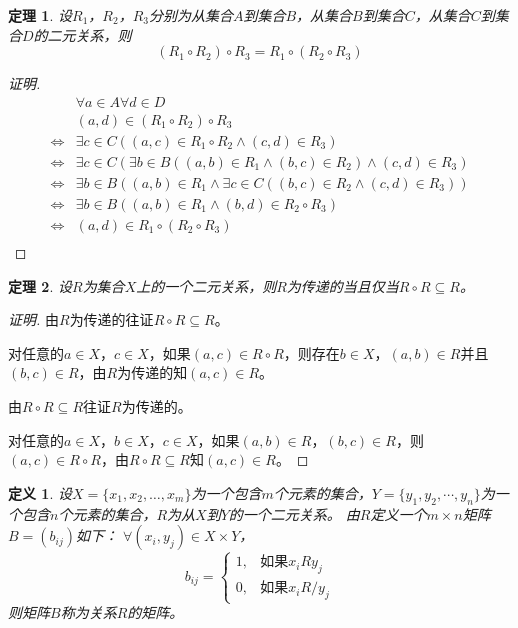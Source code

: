 \documentclass{book}[oneside]
\newtheorem{Def}{定义}[chapter]
\newtheorem{Thm}{定理}[chapter]
\begin{document}
\begin{CJK*}{UTF8}{gbsn}
    \begin{Thm}
    设$R_1$，$R_2$，$R_3$分别为从集合$A$到集合$B$，从集合$B$到集合$C$，从集合$C$到集合$D$的二元关系，则
    \[(R_1 \circ R_2)\circ R_3 = R_1 \circ (R_2 \circ R_3)\]
  \end{Thm}
  \begin{proof}[证明]
  \begin{align*}
    &\forall a\in A\forall d\in D\\
    &(a,d)\in (R_1\circ R_2)\circ R_3\\
    \Leftrightarrow&\exists c\in C((a,c)\in R_1\circ R_2 \land (c,d)\in R_3)\\
   \Leftrightarrow&\exists c\in C(\exists b\in B ((a,b)\in R_1 \land (b,c)\in R_2) \land (c,d)\in R_3)\\
   \Leftrightarrow&\exists b\in B( (a,b)\in R_1 \land \exists c\in C ((b,c)\in R_2 \land (c,d)\in R_3))\\
   \Leftrightarrow&\exists b\in B( (a,b)\in R_1 \land (b,d)\in R_2\circ R_3)\\
   \Leftrightarrow&(a,d)\in R_1 \circ (R_2 \circ R_3)\\
  \end{align*}
  \end{proof}

  \begin{Thm}
    设$R$为集合$X$上的一个二元关系，则$R$为传递的当且仅当$R\circ R \subseteq R$。
  \end{Thm}
  \begin{proof}[证明]
    由$R$为传递的往证$R\circ R\subseteq R$。

    对任意的$a\in X$，$c\in X$，如果$(a,c)\in R\circ R$，则存在$b\in X$，$(a,b)\in R$并且$(b,c)\in R$，由$R$为传递的知$(a,c)\in R$。

    由$R\circ R\subseteq R$往证$R$为传递的。

    对任意的$a\in X$，$b\in X$，$c\in X$，如果$(a,b)\in R$，$(b,c)\in R$，则$(a,c)\in R\circ R$，由$R\circ R\subseteq R$知$(a,c)\in R$。
  \end{proof}
   \begin{Def}
    设$X=\{x_1, x_2, \ldots, x_m\}$为一个包含$m$个元素的集合，$Y=\{y_1, y_2,
    \cdots, y_n\}$为一个包含$n$个元素的集合，$R$为从$X$到$Y$的一个二元关系。
    由$R$定义一个$m \times n$矩阵$B = (b_{ij})$如下： $\forall (x_i, y_j) \in X \times Y$，
\[
    b_{ij}=
      \begin{cases}
        1,&\text{如果}x_iRy_j\\
        0,&\text{如果}x_iR\!\!\! / y_j
      \end{cases}
\]
    则矩阵$B$称为关系$R$的矩阵。
  \end{Def}


\end{CJK*}
\end{document}
